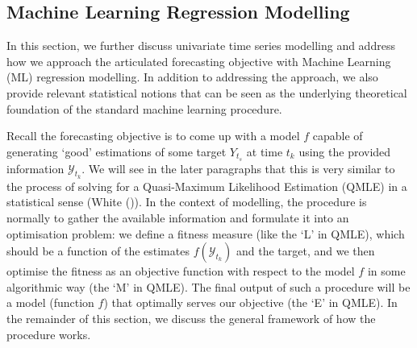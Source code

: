 \subsection{Machine Learning Regression Modelling}
In this section, we further discuss univariate time series modelling and address how we approach the articulated forecasting objective with Machine Learning (ML) regression modelling. In addition to addressing the approach, we also provide relevant statistical notions that can be seen as the underlying theoretical foundation of the standard machine learning procedure.

Recall the forecasting objective is to come up with a model $f$ capable of generating `good' estimations of some target $Y_{t_s}$ at time $t_k$ using the provided information $\mathcal{Y}_{t_k}$. We will see in the later paragraphs that this is very similar to the process of solving for a Quasi-Maximum Likelihood Estimation (QMLE) in a statistical sense (White (\citeyear{white1982maximum})). In the context of modelling, the procedure is normally to gather the available information and formulate it into an optimisation problem: we define a fitness measure (like the `L' in QMLE), which should be a function of the estimates $f(\mathcal{Y}_{t_k})$ and the target, and we then optimise the fitness as an objective function with respect to the model $f$ in some algorithmic way (the `M' in QMLE). The final output of such a procedure will be a model (function $f$) that optimally serves our objective (the `E' in QMLE). In the remainder of this section, we discuss the general framework of how the procedure works.

